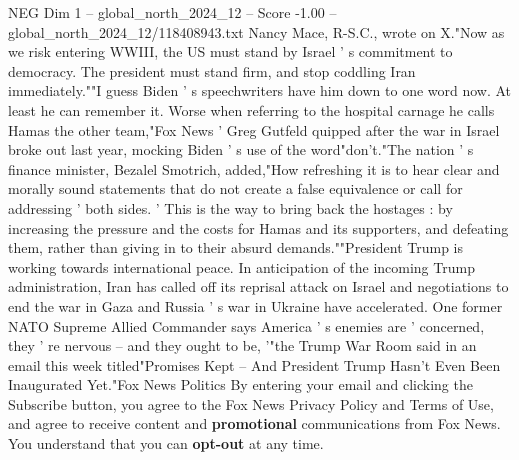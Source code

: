 \begin{textsample}{NEG Dim 1 – global\_north\_2024\_12 – Score -1.00 – global\_north\_2024\_12/118408943.txt}
Nancy Mace, R-S.C., wrote on X."Now as we risk entering WWIII, the US must stand by Israel ' s commitment to democracy.
The president must stand firm, and stop coddling Iran immediately.""I guess Biden ' s speechwriters have him down to one word now.
At least he can remember it.
Worse when referring to the hospital carnage he calls Hamas the other team,"Fox News ' Greg Gutfeld quipped after the war in Israel broke out last year, mocking Biden ' s use of the word"don't."The nation ' s finance minister, Bezalel Smotrich, added,"How refreshing it is to hear clear and morally sound statements that do not create a false equivalence or call for addressing ' both sides. ' This is the way to bring back the hostages : by increasing the pressure and the costs for Hamas and its supporters, and defeating them, rather than giving in to their absurd demands.""President Trump is working towards international peace.
In anticipation of the incoming Trump administration, Iran has called off its reprisal attack on Israel and negotiations to end the war in Gaza and Russia ' s war in Ukraine have accelerated.
One former NATO Supreme Allied Commander says America ' s enemies are ' concerned, they ' re nervous -- and they ought to be, '"the Trump War Room said in an email this week titled"Promises Kept -- And President Trump Hasn't Even Been Inaugurated Yet."Fox News Politics By entering your email and clicking the Subscribe button, you agree to the Fox News Privacy Policy and Terms of Use, and agree to receive content and \textbf{promotional} communications from Fox News.
You understand that you can \textbf{opt-out} at any time.

\end{textsample}
